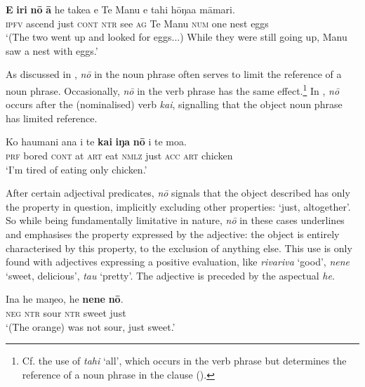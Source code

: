 \ea\label{ex:7.110}
\gll \textbf{E} \textbf{iri} \textbf{nō} \textbf{{\ꞌ}ā} he take{\ꞌ}a e Te Manu e tahi hōŋa{\ꞌ}a māmari.\\
\textsc{ipfv} ascend just \textsc{cont} \textsc{ntr} see \textsc{ag} Te Manu \textsc{num} one nest eggs\\

\glt
‘(The two went up and looked for eggs...) While they were still going up, Manu saw a nest with eggs.’ \textstyleExampleref{[R245.202–203]}
\z

As discussed in , \textit{nō} in the noun phrase often serves to limit the reference of a noun phrase. Occasionally, \textit{nō} in the verb phrase has the same effect.\footnote{\label{fn:347}Cf. the use of \textit{tahi} ‘all’, which occurs in the verb phrase but determines the reference of a noun phrase in the clause ().} In , \textit{nō} occurs after the (nominalised) verb \textit{kai}, signalling that the object noun phrase has limited reference.

\ea\label{ex:7.111}
\gll Ko ha{\ꞌ}umani {\ꞌ}ana {\ꞌ}i te \textbf{kai} \textbf{iŋa} \textbf{nō} i te moa. \\
\textsc{prf} bored \textsc{cont} at \textsc{art} eat \textsc{nmlz} just \textsc{acc} \textsc{art} chicken \\

\glt 
‘I’m tired of eating only chicken.’ \textstyleExampleref{[R229.123]} 
\z

\largerpage
After certain adjectival predicates, \textit{nō} signals that the object described has only the property in question, implicitly excluding other properties: ‘just, altogether’. So while being fundamentally limitative in nature, \textit{nō} in these cases underlines and emphasises the property expressed by the adjective: the object is entirely characterised by this property, to the exclusion of anything else. This use is only found with adjectives expressing a positive evaluation, like \textit{rivariva} ‘good’, \textit{nene} ‘sweet, delicious’, \textit{tau} ‘pretty’. The adjective is preceded by the aspectual \textit{he}.

\ea\label{ex:7.112}
\gll {\ꞌ}Ina he maŋeo, he \textbf{nene} \textbf{nō}. \\
\textsc{neg} \textsc{ntr} sour \textsc{ntr} sweet just \\

\glt 
‘(The orange) was not sour, just sweet.’ \textstyleExampleref{[Egt-02.135]}
\z

